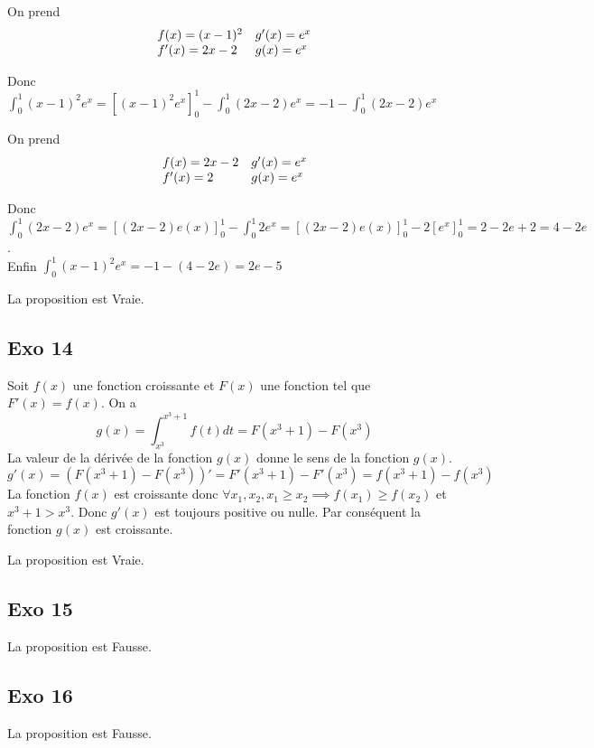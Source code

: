 \documentclass[]{book}
\theoremstyle{definition}
\begin{document}
On prend
$$
\begin{array}{l l}
 f(x) = (x-1)^2 & g'(x) = e^x\\
 f'(x) = 2x-2   & g(x) = e^x\\
\end{array}
$$

\medskip
Donc $\int_0^1(x-1)^2e^x = [(x-1)^2e^x]_0^1 - \int_0^1 (2x-2)e^x = -1 - \int_0^1 (2x-2)e^x$

On prend
$$
\begin{array}{l l}
 f(x) = 2x-2 & g'(x) = e^x\\
 f'(x) = 2   & g(x) = e^x\\
\end{array}
$$

\medskip
Donc $\int_0^1 (2x-2)e^x = [(2x-2)e(x)]_0^1 - \int_0^1 2e^x = [(2x-2)e(x)]_0^1 - 2[e^x]_0^1 = 2 - 2e + 2 = 4 - 2e$.\\

Enfin $\int_0^1(x-1)^2e^x = -1 - (4 - 2e) = 2e - 5$


La proposition est Vraie.

\subsection*{Exo 14}

Soit $f(x)$ une fonction croissante et $F(x)$ une fonction tel que $F'(x) = f(x)$. On a
$$g(x) = \int_{x^3}^{x^3+1}f(t)dt = F(x^3+1) - F(x^3)$$
La valeur de la d\'eriv\'ee de la fonction $g(x)$ donne le sens de la fonction $g(x)$.
$$g'(x) = (F(x^3+1) - F(x^3))' = F'(x^3+1) - F'(x^3) = f(x^3+1) - f(x^3)$$
La fonction $f(x)$ est croissante donc $\forall x_1, x_2, x_1 \geq x_2 \implies f(x_1) \geq f(x_2)$ et $x^3+1 > x^3$. Donc $g'(x)$ est toujours positive ou nulle. Par cons\'equent la fonction $g(x)$ est croissante.

La proposition est Vraie.

\subsection*{Exo 15}

La proposition est Fausse.

\subsection*{Exo 16}

La proposition est Fausse.
\end{document}
